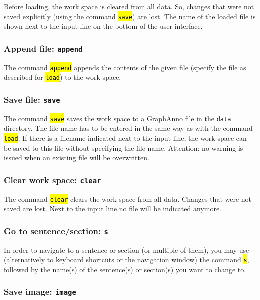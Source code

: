 \documentclass[12pt]{scrartcl}
\newcommand{\code}[1]{\hl{\texttt{#1}}}
\begin{document}
Before loading, the work space is cleared from all data.
So, changes that were not saved explicitly (using the command \code{save}) are lost.
The name of the loaded file is shown next to the input line on the bottom of the user interface.


\subsubsection{Append file: \texttt{append}}

The command \code{append} appends the contents of the given file (specify the file as described for \code{load}) to the work space.


\subsubsection{Save file: \texttt{save}}

The command \code{save} saves the work space to a GraphAnno file in the \texttt{data} directory.
The file name has to be entered in the same way as with the command \code{load}.
If there is a filename indicated next to the input line, the work space can be saved to this file without specifying the file name.
Attention: no warning is issued when an existing file will be overwritten.


\subsubsection{Clear work space: \texttt{clear}}

The command \code{clear} clears the work space from all data.
Changes that were not saved are lost.
Next to the input line no file will be indicated anymore.


\subsubsection{Go to sentence/section: \texttt{s}}\label{befehl-s}

In order to navigate to a sentence or section (or multiple of them), you may use (alternatively to \hyperref[shortcuts]{keyboard shortcuts} or the \hyperref[window-navigation]{navigation window}) the command \code{s}, followed by the name(s) of the sentence(s) or section(s) you want to change to.


\subsubsection{Save image: \texttt{image}}
\end{document}
